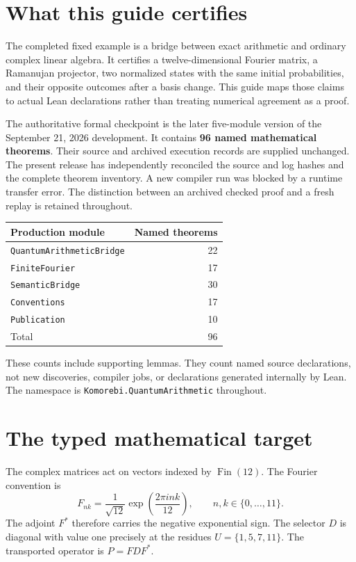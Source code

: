 \section{What this guide certifies}
The completed fixed example is a bridge between exact arithmetic and ordinary
complex linear algebra. It certifies a twelve-dimensional Fourier matrix, a
Ramanujan projector, two normalized states with the same initial probabilities,
and their opposite outcomes after a basis change. This guide maps those claims to
actual Lean declarations rather than treating numerical agreement as a proof.

The authoritative formal checkpoint is the later five-module version of the
September 21, 2026 development. It contains \textbf{96 named mathematical
theorems}. Their source and archived execution records are supplied unchanged.
The present release has independently reconciled the source and log hashes and
the complete theorem inventory. A new compiler run was blocked by a runtime
transfer error. The distinction between an archived checked proof and a fresh
replay is retained throughout.

\begin{center}
\begin{tabular}{lr}
\toprule
Production module & Named theorems\\
\midrule
\texttt{QuantumArithmeticBridge} & 22\\
\texttt{FiniteFourier} & 17\\
\texttt{SemanticBridge} & 30\\
\texttt{Conventions} & 17\\
\texttt{Publication} & 10\\
\midrule
Total & 96\\
\bottomrule
\end{tabular}
\end{center}

These counts include supporting lemmas. They count named source declarations,
not new discoveries, compiler jobs, or declarations generated internally by Lean.
The namespace is \texttt{Komorebi.QuantumArithmetic} throughout.

\section{The typed mathematical target}
The complex matrices act on vectors indexed by \(\operatorname{Fin}(12)\).
The Fourier convention is
\[
 F_{nk}=\frac{1}{\sqrt{12}}\exp\!\left(\frac{2\pi i nk}{12}\right),
 \qquad n,k\in\{0,\ldots,11\}.
\]
The adjoint \(F^*\) therefore carries the negative exponential sign. The
selector \(D\) is diagonal with value one precisely at the residues
\(U=\{1,5,7,11\}\). The transported operator is \(P=FDF^*\).

